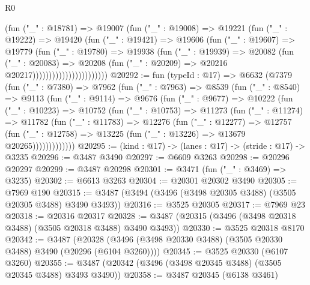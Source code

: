 \begin{lexlean}{R0}
\begin{coremodule}
                                (fun ("_" : @18781) =>
                                @19007
                                  (fun ("_" : @19008) =>
                                  @19221
                                    (fun ("_" : @19222) =>
                                    @19420
                                      (fun ("_" : @19421) =>
                                      @19606
                                        (fun ("_" : @19607) =>
                                        @19779
                                          (fun ("_" : @19780) =>
                                          @19938
                                            (fun ("_" : @19939) =>
                                            @20082
                                              (fun ("_" : @20083) =>
                                              @20208
                                                (fun ("_" : @20209) =>
                                                @20216 @20217)))))))))))))))))))))))
@20292 := fun (typeId : @17) =>
  @6632
    (@7379
      (fun ("_" : @7380) =>
      @7962
        (fun ("_" : @7963) =>
        @8539
          (fun ("_" : @8540) =>
          @9113
            (fun ("_" : @9114) =>
            @9676
              (fun ("_" : @9677) =>
              @10222
                (fun ("_" : @10223) =>
                @10752
                  (fun ("_" : @10753) =>
                  @11273
                    (fun ("_" : @11274) =>
                    @11782
                      (fun ("_" : @11783) =>
                      @12276
                        (fun ("_" : @12277) =>
                        @12757
                          (fun ("_" : @12758) =>
                          @13225 (fun ("_" : @13226) => @13679 @20265)))))))))))))
@20295 := (kind : @17) -> (lanes : @17) -> (stride : @17) -> @3235
@20296 := @3487 @3490
@20297 := @6609 @3263
@20298 := @20296 @20297
@20299 := @3487 @20298
@20301 := @3471 (fun ("_" : @3469) => @3235)
@20302 := @6613 @3263
@20304 := @20301 @20302 @3490
@20305 := @7969 @190
@20315 := @3487 (@3494 (@3496 (@3498 @20305 @3488) (@3505 @20305 @3488) @3490 @3493))
@20316 := @3525 @20305
@20317 := @7969 @23
@20318 := @20316 @20317
@20328 := @3487 (@20315 (@3496 (@3498 @20318 @3488) (@3505 @20318 @3488) @3490 @3493))
@20330 := @3525 @20318 @8170
@20342 := @3487
    (@20328 (@3496 (@3498 @20330 @3488) (@3505 @20330 @3488) @3490 (@20296 (@6104 @3260))))
@20345 := @3525 @20330 (@6107 @3260)
@20355 := @3487 (@20342 (@3496 (@3498 @20345 @3488) (@3505 @20345 @3488) @3493 @3490))
@20358 := @3487 @20345 (@6138 @3461)

\end{coremodule}
\end{lexlean}
